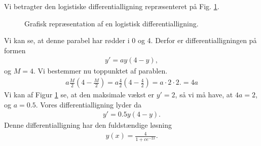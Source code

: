 \begin{exa}
	Vi betragter den logistiske differentialligning repræsenteret på Fig. \ref{fig:logist2}.
	\begin{figure}[H]
		\centering
		\caption{Grafisk repræsentation af en logistisk differentialligning.}
		\label{fig:logist2}
	\end{figure}
	Vi kan se, at denne parabel har rødder i 0 og 4. Derfor er differentialligningen på formen
	\begin{align*}
		y' = ay(4-y),
	\end{align*}
	og $M =4$. Vi bestemmer nu toppunktet af parablen.
	\begin{align*}
		a\frac{M}{2}(4-\frac{M}{2}) = a\frac{4}{2}(4-\frac{4}{2}) = a\cdot 2\cdot 2. = 4a
	\end{align*}
	Vi kan af Figur \ref{fig:logist2} se, at den maksimale vækst er $y' = 2$, så vi må have, at $4a = 2$, og $a=0.5$.
	Vores differentialligning lyder da
	\begin{align*}
		y' = 0.5y(4-y).
	\end{align*}
	Denne differentialligning har den fuldstændige løsning
	\begin{align*}
		y(x) = \frac{4}{1+ce^{-2x}}.
	\end{align*}
\end{exa}

